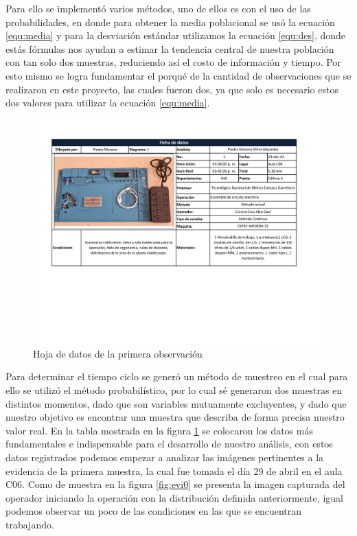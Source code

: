     Para ello se implementó varios métodos, uno de ellos es con el uso de las probabilidades, en donde para obtener la media poblacional se usó la ecuación \ref{equ:media} y para  la desviación estándar utilizamos la ecuación \ref{equ:des}, donde estás fórmulas nos ayudan a estimar la tendencia central de nuestra población con tan solo dos muestras, reduciendo así el costo de información y tiempo. Por esto mismo se logra fundamentar el porqué de la cantidad de observaciones que se realizaron en este proyecto, las cuales fueron dos, ya que solo es necesario estos dos valores para utilizar la ecuación \ref{equ:media}.
       
    \begin{figure}[H]
        \centering
        \includegraphics[trim = {17mm 70mm 25mm 15mm},clip,scale=0.37]{22/Img/hojaDeDatos1.pdf}
        \caption{Hoja de datos de la primera observación}
        \label{fig:hoja1}
    \end{figure}
    
    
    Para determinar el tiempo ciclo se generó un método de muestreo en el cual para ello se utilizó el método probabilístico, por lo cual sé generaron dos muestras en distintos momentos, dado que son variables mutuamente excluyentes, y dado que nuestro objetivo es encontrar una muestra que describa de forma precisa nuestro valor real. En la tabla mostrada en la figura \ref{fig:hoja1} se colocaron los datos más fundamentales e indispensable para el desarrollo de nuestro análisis, con estos datos registrados podemos empezar a analizar las imágenes pertinentes a la evidencia de la primera muestra, la cual fue tomada el día 29 de abril en el aula C06. Como de muestra en la figura \ref{fig:evi0} se presenta la imagen capturada del operador iniciando la operación con la distribución definida anteriormente, igual podemos observar un poco de las condiciones en las que se encuentran trabajando. 
    
